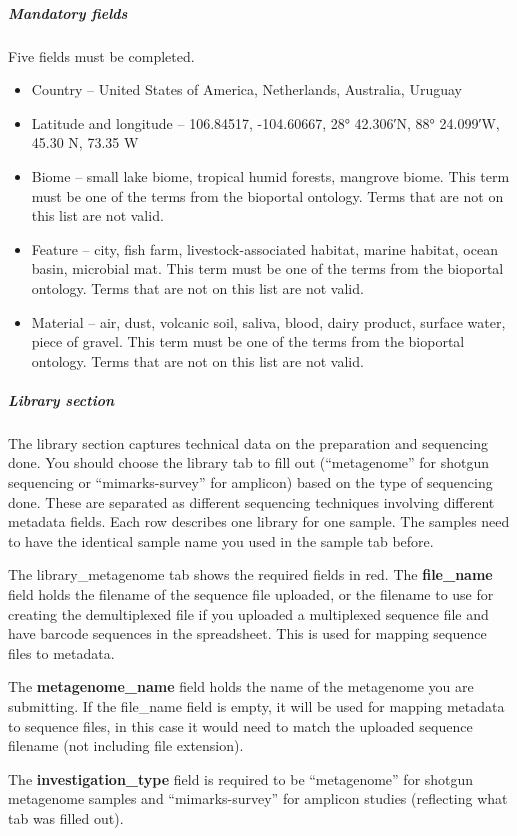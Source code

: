 \documentclass[12pt,fullpage]{report}
\begin{document}
\subparagraph*{Mandatory fields}
Five fields must be completed.
\begin{itemize}
\item Country --
United States of America, Netherlands, Australia, Uruguay
\item Latitude and longitude --
106.84517, -104.60667, 28° 42.306′N, 88° 24.099′W, 45.30 N, 73.35 W
\item Biome --
small lake biome, tropical humid forests, mangrove biome. This term must be one of the terms from the bioportal ontology. Terms that are not on this list are not valid.
\item Feature --
city, fish farm, livestock-associated habitat, marine habitat, ocean basin, microbial mat. This term must be one of the terms from the bioportal ontology. Terms that are not on this list are not valid.
\item Material --
air, dust, volcanic soil, saliva, blood, dairy product, surface water, piece of gravel. This term must be one of the terms from the bioportal ontology. Terms that are not on this list are not valid.
\end{itemize}

\subparagraph*{Library section}
The library section
captures technical data on the preparation and sequencing done. You should choose the library tab to fill out (``metagenome'' for shotgun sequencing or ``mimarks-survey'' for amplicon) based on the type of sequencing done. These are separated as different sequencing techniques involving different metadata fields. Each row describes one library for one sample. The samples need to have the identical sample name you used in the sample tab before.

The library\_metagenome tab shows the required fields in red.
The \textbf{file\_name} field holds the filename of the sequence file uploaded, or the filename to use for creating the demultiplexed file if you uploaded a multiplexed sequence file and have barcode sequences in the spreadsheet. This is used for mapping sequence files to metadata.

The \textbf{metagenome\_name} field holds the name of the metagenome you are submitting. If the file\_name field is empty, it will be used for mapping metadata to sequence files, in this case it would need to match the uploaded sequence filename (not including file extension).

The \textbf{investigation\_type} field is required to be ``metagenome'' for shotgun metagenome samples and ``mimarks-survey'' for amplicon studies (reflecting what tab was filled out).
\end{document}

